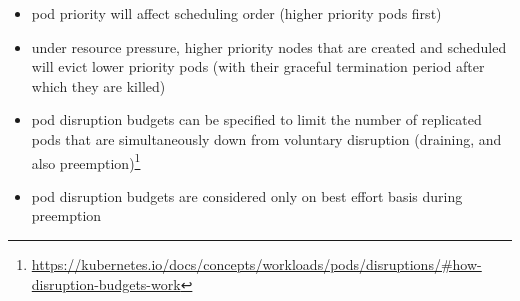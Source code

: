 \begin{enumerate}
\begin{itemize}
        \item pod priority will affect scheduling order (higher priority pods first)
        \item under resource pressure, higher priority nodes that are created and scheduled will evict lower priority pods (with their graceful termination period after which they are killed)
        \item pod disruption budgets can be specified to limit the number of replicated pods that are simultaneously down from voluntary disruption (draining, and also preemption)\footnote{\url{https://kubernetes.io/docs/concepts/workloads/pods/disruptions/\#how-disruption-budgets-work}}
        \item pod disruption budgets are considered only on best effort basis during preemption
      \end{itemize}
  \end{enumerate}